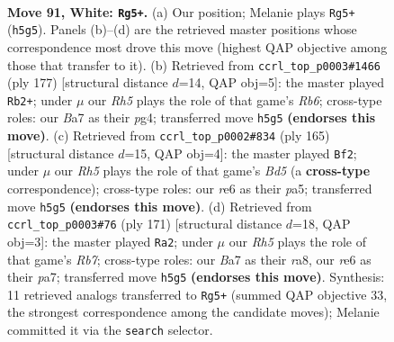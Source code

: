 \documentclass[11pt]{article}
\begin{document}
\clearpage

\begin{figure}[p]\centering
\begin{subfigure}{0.46\textwidth}\centering
\resizebox{\linewidth}{!}{%
\newchessgame
\chessboard[
  setfen={6k1/B7/4r3/7R/4p3/1K3p1P/5P2/8 w - - 7 91},
  showmover=false,
  pgfstyle=straightmove, color=movearrow, markmove={h5-g5}
]}
\caption{}
\end{subfigure}\hfill
\begin{subfigure}{0.46\textwidth}\centering
\resizebox{\linewidth}{!}{%
\newchessgame
\chessboard[
  setfen={8/5pk1/4p3/4P3/3R1PP1/1r6/5K2/8 b - - 94 89},
  showmover=false,
  pgfstyle=straightmove, color=movearrow, markmove={b3-b2}
]}
\caption{}
\end{subfigure}
\\[4pt]
\begin{subfigure}{0.46\textwidth}\centering
\resizebox{\linewidth}{!}{%
\newchessgame
\chessboard[
  setfen={1k6/7B/5p1p/PK5P/3b2P1/8/8/8 b - - 42 83},
  showmover=false,
  pgfstyle=straightmove, color=movearrow, markmove={d4-f2}
]}
\caption{}
\end{subfigure}\hfill
\begin{subfigure}{0.46\textwidth}\centering
\resizebox{\linewidth}{!}{%
\newchessgame
\chessboard[
  setfen={R7/P4kp1/2K4p/7P/8/8/1r6/8 b - - 14 86},
  showmover=false,
  pgfstyle=straightmove, color=movearrow, markmove={b2-a2}
]}
\caption{}
\end{subfigure}
\caption{\textbf{Move 91, White: \texttt{Rg5+}.} (a) Our position; Melanie plays \texttt{Rg5+} (\texttt{h5g5}). Panels (b)--(d) are the retrieved master positions whose correspondence most drove this move (highest QAP objective among those that transfer to it). (b) Retrieved from \texttt{ccrl\_top\_p0003\#1466} (ply 177) [structural distance $d$=14, QAP obj=5]: the master played \texttt{Rb2+}; under $\mu$ our \emph{Rh5} plays the role of that game's \emph{Rb6}; cross-type roles: our \emph{B}a7 as their \emph{p}g4; transferred move \texttt{h5g5} \textbf{(endorses this move)}. (c) Retrieved from \texttt{ccrl\_top\_p0002\#834} (ply 165) [structural distance $d$=15, QAP obj=4]: the master played \texttt{Bf2}; under $\mu$ our \emph{Rh5} plays the role of that game's \emph{Bd5} (a \textbf{cross-type} correspondence); cross-type roles: our \emph{r}e6 as their \emph{p}a5; transferred move \texttt{h5g5} \textbf{(endorses this move)}. (d) Retrieved from \texttt{ccrl\_top\_p0003\#76} (ply 171) [structural distance $d$=18, QAP obj=3]: the master played \texttt{Ra2}; under $\mu$ our \emph{Rh5} plays the role of that game's \emph{Rb7}; cross-type roles: our \emph{B}a7 as their \emph{r}a8, our \emph{r}e6 as their \emph{p}a7; transferred move \texttt{h5g5} \textbf{(endorses this move)}. Synthesis: 11 retrieved analogs transferred to \texttt{Rg5+} (summed QAP objective 33, the strongest correspondence among the candidate moves); Melanie committed it via the \texttt{search} selector.}
\label{fig:thought-m180}
\end{figure}
\end{document}
